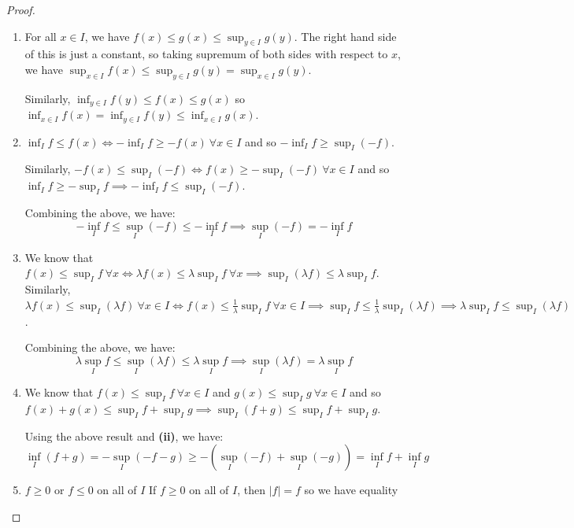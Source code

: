 \documentclass[../main.tex]{subfiles}
\begin{document}
\begin{proof}
  \begin{enumerate}
    \item For all $x \in I$, we have $f(x) \leq g(x) \leq \sup_{y \in I} g(y)$.
      The right hand side of this is just a constant, so taking supremum of both sides with respect to $x$, we have $\sup_{x \in I} f(x) \leq \sup_{y \in I} g(y) = \sup_{x \in I} g(y)$.

      Similarly, $\inf_{y \in I} f(y) \leq f(x) \leq g(x)$ so $\inf_{x \in I} f(x) = \inf_{y \in I} f(y) \leq \inf_{x \in I} g(x)$.
    \item $\inf_{I} f \leq f(x) \iff - \inf_{I} f \geq -f(x) \ \forall x \in I$ and so $-\inf_{I} f \geq \sup_{I} (-f)$.

      Similarly, $-f(x) \leq \sup_{I} (-f) \iff f(x) \geq -\sup_{I} (-f)\ \forall x \in I$ and so $\inf_{I} f \geq -\sup_{I} f \implies -\inf_{I} f \leq \sup_{I} (-f)$.

      Combining the above, we have:
      \[
        -\inf_{I} f \leq \sup_{I} (-f) \leq -\inf_{I} f \implies \sup_{I} (-f) = - \inf_{I} f
      \]
    \item We know that $f(x) \leq \sup_{I} f\ \forall x \iff \lambda f(x) \leq \lambda \sup_{I} f\ \forall x \implies \sup_{I} (\lambda f) \leq \lambda \sup_{I} f$.
      Similarly, $\lambda f(x) \leq \sup_{I} (\lambda f)\ \forall x \in I \iff f(x) \leq \frac{1}{\lambda}\sup_{I} f\ \forall x \in I \implies \sup_{I} f \leq \frac{1}{\lambda}\sup_{I} (\lambda f) \implies \lambda \sup_{I} f \leq \sup_{I} (\lambda f)$.

      Combining the above, we have:
      \[
        \lambda \sup_{I} f \leq \sup_{I} (\lambda f) \leq \lambda \sup_{I} f \implies \sup_{I} (\lambda f) = \lambda \sup_{I} f
      \]
    \item We know that $f(x) \leq \sup_{I} f\ \forall x \in I$ and $g(x) \leq \sup_{I} g\ \forall x \in I$ and so $f(x) + g(x) \leq \sup_{I} f + \sup_{I} g \implies \sup_{I} (f + g) \leq \sup_{I} f + \sup_{I} g$.

      Using the above result and \textbf{(ii)}, we have:
      \[
        \inf_{I} (f + g) = - \sup_{I} (-f - g) \geq -(\sup_{I} (-f) + \sup_{I} (-g)) = \inf_{I} f + \inf_{I} g
      \]
    \item
      \begin{proofcases}
        \begin{case}{$f \geq 0$ or $f \leq 0$ on all of $I$}
          If $f \geq 0$ on all of $I$, then $|f| = f$ so we have equality


\end{case}
\end{proofcases}
\end{enumerate}
\end{proof}
\end{document}
